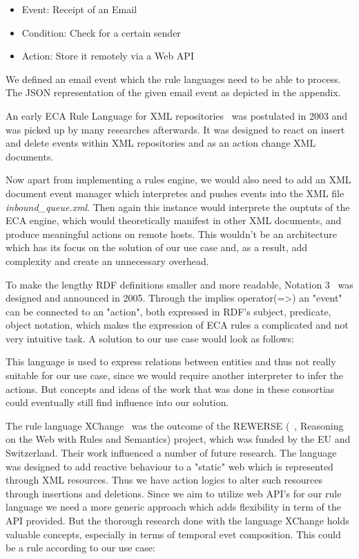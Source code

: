 \begin{itemize}
  \item Event: Receipt of an Email
  \item Condition: Check for a certain sender
  \item Action: Store it remotely via a Web API
\end{itemize}

We defined an email event which the rule languages need to be able to process.
The JSON representation of the given email event as depicted in the appendix. %


An early ECA Rule Language for XML repositories~\cite{Papamarkos03event-condition-actionrule} was postulated in 2003 and was picked up by many researches afterwards. It was designed to react on insert and delete events within XML repositories and as an action change XML documents.


Now apart from implementing a rules engine, we would also need to add an XML document event manager which interpretes and pushes events into the XML file \emph{inbound\_queue.xml}. Then again this instance would interprete the ouptuts of the ECA engine, which would theoretically manifest in other XML documents, and produce meaningful actions on remote hosts. This wouldn't be an architecture which has its focus on the solution of our use case and, as a result, add complexity and create an unnecessary overhead.

To make the lengthy RDF definitions smaller and more readable, Notation 3~\cite{wwwn3} was designed and announced in 2005. Through the implies operator(=\textgreater) an "event" can be connected to an "action", both expressed in RDF's subject, predicate, object notation, which makes the expression of ECA rules a complicated and not very intuitive task. A solution to our use case would look as follows:

This language is used to express relations between entities and thus not really suitable for our use case, since we would require another interpreter to infer the actions. But concepts and ideas of the work that was done in these consortias could eventually still find influence into our solution.

The rule language XChange~\cite{2005-Patranjan-TLE.pdf} was the outcome of the REWERSE (~\cite{wwwRewerse}, Reasoning on the Web with Rules and Semantics) project, which was funded by the EU and Switzerland. Their work influenced a number of future research. The language was designed to add reactive behaviour to a "static" web which is represented through XML resources. Thus we have action logics to alter such resources through insertions and deletions. Since we aim to utilize web API's for our rule language we need a more generic approach which adds flexibility in term of the API provided. But the thorough research done with the language XChange holds valuable concepts, especially in terms of temporal evet composition. This could be a rule according to our use case:


